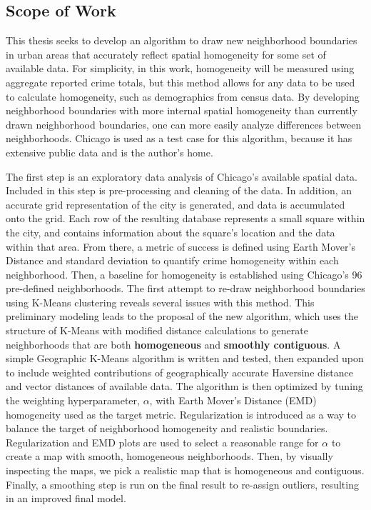 \documentclass[times new roman,12pt]{article}
\begin{document}
\subsection{Scope of Work}

This thesis seeks to develop an algorithm to draw new neighborhood boundaries in urban areas that accurately reflect spatial homogeneity for some set of available data. For simplicity, in this work, homogeneity will be measured using aggregate reported crime totals, but this method allows for any data to be used to calculate homogeneity, such as demographics from census data. By developing neighborhood boundaries with more internal spatial homogeneity than currently drawn neighborhood boundaries, one can more easily analyze differences between neighborhoods. Chicago is used as a test case for this algorithm, because it has extensive public data and is the author's home. 

The first step is an exploratory data analysis of Chicago's available spatial data. Included in this step is pre-processing and cleaning of the data. In addition, an accurate grid representation of the city is generated, and data is accumulated onto the grid. Each row of the resulting database represents a small square within the city, and contains information about the square's location and the data within that area. From there, a metric of success is defined using Earth Mover's Distance and standard deviation to quantify crime homogeneity within each neighborhood. Then, a baseline for homogeneity is established using Chicago's 96 pre-defined neighborhoods. The first attempt to re-draw neighborhood boundaries using K-Means clustering reveals several issues with this method. This preliminary modeling leads to the proposal of the new algorithm, which uses the structure of K-Means with modified distance calculations to generate neighborhoods that are both \textbf{homogeneous} and \textbf{smoothly contiguous}. A simple Geographic K-Means algorithm is written and tested, then expanded upon to include weighted contributions of geographically accurate Haversine distance and vector distances of available data. The algorithm is then optimized by tuning the weighting hyperparameter, $\alpha$, with Earth Mover's Distance (EMD) homogeneity used as the target metric. Regularization is introduced as a way to balance the target of neighborhood homogeneity and realistic boundaries. Regularization and EMD plots are used to select a reasonable range for $\alpha$ to create a map with smooth, homogeneous neighborhoods. Then, by visually inspecting the maps, we pick a realistic map that is homogeneous and contiguous. Finally, a smoothing step is run on the final result to re-assign outliers, resulting in an improved final model. 
\end{document}
